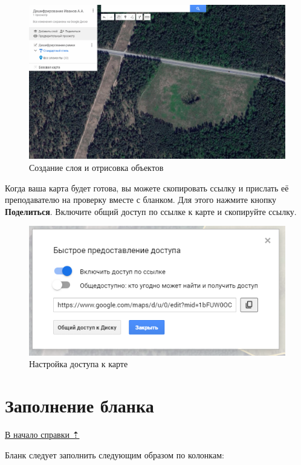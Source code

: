 \documentclass[
  12pt,
]{book}
\begin{document}
\begin{figure}
\centering
\includegraphics{images/Interpretation/Draw_polygon.gif}
\caption{Создание слоя и отрисовка объектов}
\end{figure}

Когда ваша карта будет готова, вы можете скопировать ссылку и прислать её преподавателю на проверку вместе с бланком. Для этого нажмите кнопку \textbf{Поделиться}. Включите общий доступ по ссылке к карте и скопируйте ссылку.

\begin{figure}
\centering
\includegraphics{images/Interpretation/Share.png}
\caption{Настройка доступа к карте}
\end{figure}

\section{Заполнение бланка}\label{interpretation-blank}

\hyperref[interpretation]{В начало справки ⇡}

Бланк следует заполнить следующим образом по колонкам:
\end{document}
